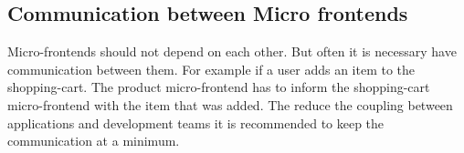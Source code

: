 \subsection{Communication between Micro frontends}

Micro-frontends should not depend on each other. But often it is necessary have communication between them. For example if a user adds an item to the shopping-cart. The product micro-frontend has to inform the shopping-cart micro-frontend with the item that was added. The reduce the coupling between applications and development teams it is recommended to keep the communication at a minimum.
